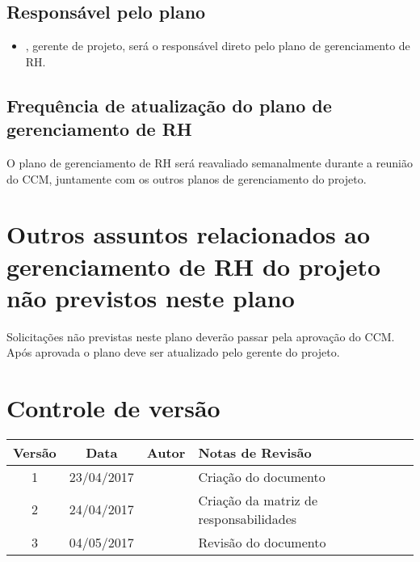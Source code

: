 \subsection{Responsável pelo plano}

\begin{itemize}
	\item \projectManagerName{}, gerente de projeto, será o responsável direto pelo plano de gerenciamento de RH.
\end{itemize}

\subsection{Frequência de atualização do plano de gerenciamento de RH}

O plano de gerenciamento de RH será reavaliado semanalmente durante a reunião do CCM, juntamente com os outros planos de gerenciamento do projeto.

\section{Outros assuntos relacionados ao gerenciamento de RH do projeto não previstos neste plano}

Solicitações não previstas neste plano deverão passar pela aprovação do CCM. Após aprovada o plano deve ser atualizado pelo gerente do projeto.

\section{Controle de versão}

\begin{table}[H]
	\begin{tabularx}{\textwidth}{| c | c | X | X |}
		\hline
		\textbf{Versão} & \textbf{Data} & \textbf{Autor}        & \textbf{Notas de Revisão}               \\
		\hline
		1                & 23/04/2017    & \projectManagerName{} & Criação do documento                   \\
		\hline
		2                & 24/04/2017    & \projectManagerName{} & Criação da matriz de responsabilidades \\
		\hline
		3                & 04/05/2017    & \projectManagerName{} & Revisão do documento                    \\
		\hline
	\end{tabularx}
	\centering
\end{table}

